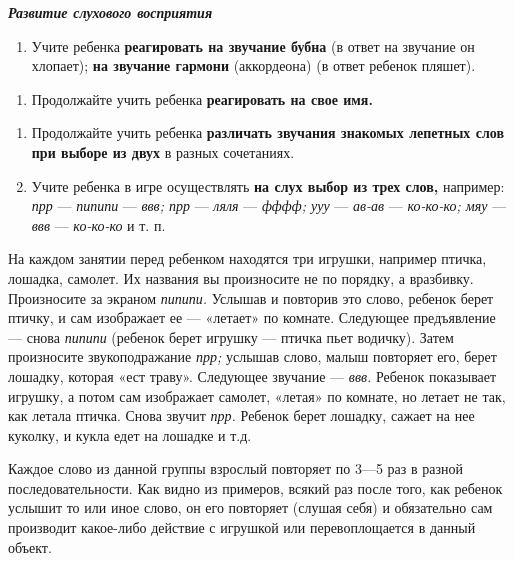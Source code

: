 \documentclass{book}
\renewcommand{\emph}[1]{\textit{#1}}
\begin{document}
\emph{\textbf{Развитие слухового восприятия}}


\begin{enumerate}
\def\labelenumi{\arabic{enumi}.}
\item
  
  Учите ребенка \textbf{реагировать на звучание бубна} (в ответ на
  звучание он хлопает); \textbf{на звучание гармони} (аккордеона) (в
  ответ ребенок пляшет).
  
\end{enumerate}

\begin{enumerate}
\def\labelenumi{\arabic{enumi}.}
\item
  
  Продолжайте учить ребенка \textbf{реагировать на свое имя.}
  
\end{enumerate}

\begin{enumerate}
\def\labelenumi{\arabic{enumi}.}
\setcounter{enumi}{1}
\item
  
  Продолжайте учить ребенка \textbf{различать звучания знакомых лепетных
  слов при выборе из двух} в разных сочетаниях.
  
\item
  
  Учите ребенка в игре осуществлять \textbf{на слух выбор из трех слов,}
  например: \emph{прр} --- \emph{пипипи} --- \emph{ввв; прр} ---
  \emph{ляля} --- \emph{фффф; ууу} --- \emph{ав-ав} --- \emph{ко-ко-ко;
  мяу} --- \emph{ввв} --- \emph{ко-ко-ко} и т. п.
  
\end{enumerate}


На каждом занятии перед ребенком находятся три игрушки, например птичка,
лошадка, самолет. Их названия вы произносите не по порядку, а вразбивку.
Произносите за экраном \emph{пипипи.} Услышав и повторив это слово,
ребенок берет птичку, и сам изображает ее --- «летает» по комнате.
Следующее предъявление --- снова \emph{пипипи} (ребенок берет игрушку
--- птичка пьет водичку). Затем произносите звукоподражание \emph{прр;}
услышав слово, малыш повторяет его, берет лошадку, которая «ест траву».
Следующее звучание --- \emph{ввв.} Ребенок показывает игрушку, а потом
сам изображает самолет, «летая» по комнате, но летает не так, как летала
птичка. Снова звучит \emph{прр.} Ребенок берет лошадку, сажает на нее
куколку, и кукла едет на лошадке и т.д.

Каждое слово из данной группы взрослый повторяет по 3---5 раз в разной
последовательности. Как видно из примеров, всякий раз после того, как
ребенок услышит то или иное слово, он его повторяет (слушая себя) и
обязательно сам производит какое-либо действие с игрушкой или
перевоплощается в данный объект.
\end{document}

